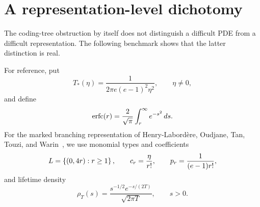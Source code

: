 \section{A representation-level dichotomy}
\label{sec:dichotomy}

The coding-tree obstruction by itself does not distinguish a difficult PDE from a difficult representation. The following benchmark shows that the latter distinction is real.

For reference, put
\begin{equation}
  T_*(\eta)
  =
  \frac1{2\pi e(e-1)^2\eta^2},
  \qquad \eta\neq0,
  \label{eq:T-star}
\end{equation}
and define
\begin{equation*}
  \operatorname{erfc}(r)=\frac2{\sqrt\pi}\int_r^\infty e^{-s^2}\,ds.
\end{equation*}
For the marked branching representation of Henry-Labord\`ere, Oudjane, Tan, Touzi, and Warin~\cite{HenryLabordereEtAl2019}, we use monomial types and coefficients
\begin{equation*}
  L=\left\{(0,4r):r\geq1\right\},
  \qquad
  c_r=\frac\eta{r!},
  \qquad
  p_r=\frac1{(e-1)r!},
\end{equation*}
and lifetime density
\begin{equation}
  \rho_T(s)
  =
  \frac{s^{-1/2}e^{-s/(2T)}}{\sqrt{2\pi T}},
  \qquad s>0.
  \label{eq:HLOTW-lifetime}
\end{equation}

